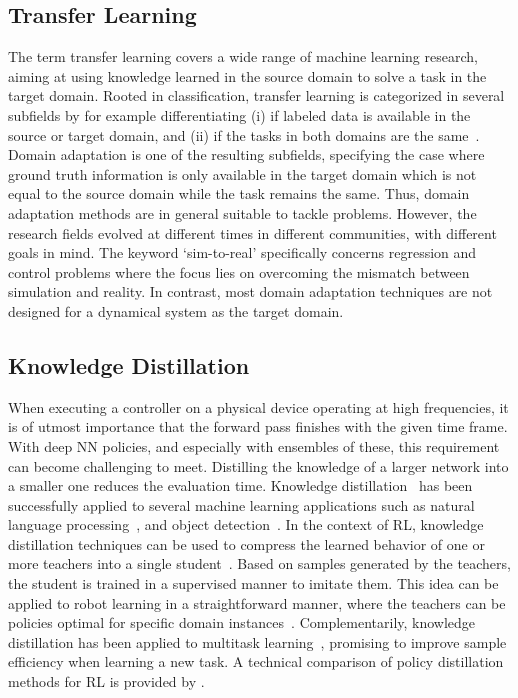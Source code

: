 \documentclass[utf8]{frontiersSCNS} %
\begin{document}
\subsection{Transfer Learning}
\label{sec_sota_transfer_learning}
The term transfer learning covers a wide range of machine learning research, aiming at using knowledge learned in the source domain to solve a task in the target domain.
Rooted in classification, transfer learning is categorized in several subfields by for example differentiating (i) if labeled data is available in the source or target domain, and (ii) if the tasks in both domains are the same~\citep{Pan_Yang_10,Zhuang_He_21}.
Domain adaptation is one of the resulting subfields, specifying the case where ground truth information is only available in the target domain which is not equal to the source domain while the task remains the same.
Thus, domain adaptation methods are in general suitable to tackle \simtoreal problems.
However, the research fields evolved at different times in different communities, with different goals in mind.
The keyword \enquote*{sim-to-real} specifically concerns regression and control problems where the focus lies on overcoming the mismatch between simulation and reality.
In contrast, most domain adaptation techniques are not designed for a dynamical system as the target domain.

\subsection{Knowledge Distillation}
\label{sec_sota_knowledge_distillation}
When executing a controller on a physical device operating at high frequencies, it is of utmost importance that the forward pass finishes with the given time frame.
With deep \ac{NN} policies, and especially with ensembles of these, this requirement can become challenging to meet.
Distilling the knowledge of a larger network into a smaller one reduces the evaluation time.
Knowledge distillation~\citep{Hinton_Dean_15} has been successfully applied to several machine learning applications such as natural language processing~\citep{Cui_Rosenberg_17}, and object detection~\citep{Chen_Chandraker_17}.
In the context of \ac{RL}, knowledge distillation techniques can be used to compress the learned behavior of one or more teachers into a single student~\citep{Rusu_Hadsell_16_ICLR}.
Based on samples generated by the teachers, the student is trained in a supervised manner to imitate them.
This idea can be applied to \simtoreal robot learning in a straightforward manner, where the teachers can be policies optimal for specific domain instances~\citep{Brosseit_Hahner_Muratore_Peters_21}.
Complementarily, knowledge distillation has been applied to multitask learning~\citep{Parisotto_Salakhutdinov_15,Teh_Pascanu_17}, promising to improve sample efficiency when learning a new task.
A technical comparison of policy distillation methods for \ac{RL} is provided by \citet{Czarnecki_Jaderberg_19}.
\end{document}
